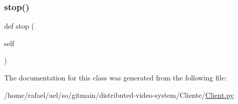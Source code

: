 \mbox{\label{class_client_1_1_player_auto_a26ca7c1c7fcdd35378e7be97727047a6}} 
\subsubsection{\texorpdfstring{stop()}{stop()}}
{\footnotesize\ttfamily def stop (\begin{DoxyParamCaption}\item[{}]{self }\end{DoxyParamCaption})}



The documentation for this class was generated from the following file\+:\begin{DoxyCompactItemize}
\item 
/home/rafael/uel/so/gitmain/distributed-\/video-\/system/\+Cliente/\hyperlink{_client_8py}{Client.\+py}\end{DoxyCompactItemize}
